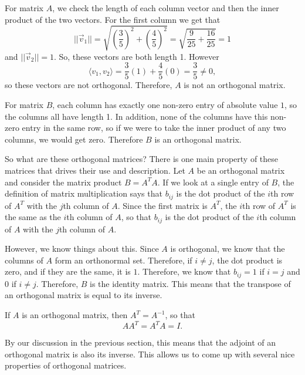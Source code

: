 \documentclass{ximera}
\begin{document}
\begin{exampleSol}
    For matrix $A$, we check the length of each column vector and then the inner product of the two vectors. For the first column we get that
    \[ 
        ||\vec{v}_1|| = \sqrt{\left(\frac{3}{5}\right)^2 + \left(\frac{4}{5}\right)^2} = \sqrt{\frac{9}{25} + \frac{16}{25}} = 1 
    \] 
    and $||\vec{v}_2|| = 1$. So, these vectors are both length 1. However
    \[
        \langle v_1, v_2 \rangle = \frac{3}{5}(1) + \frac{4}{5}(0) = \frac{3}{5} \neq 0, 
    \] 
    so these vectors are not orthogonal. Therefore, $A$ is not an orthogonal matrix.
    
    For matrix $B$, each column has exactly one non-zero entry of absolute value $1$, so the columns all have length 1. In addition, none of the columns have this non-zero entry in the same row, so if we were to take the inner product of any two columns, we would get zero. Therefore $B$ is an orthogonal matrix. 
\end{exampleSol}

So what are these orthogonal matrices? There is one main property of these matrices that drives their use and description. Let $A$ be an orthogonal matrix and consider the matrix product $B = A^TA$. If we look at a single entry of $B$, the definition of matrix multiplication says that $b_{ij}$ is the dot product of the $i$th row of $A^T$ with the $j$th column of $A$. Since the first matrix is $A^T$, the $i$th row of $A^T$ is the same as the $i$th column of $A$, so that $b_{ij}$ is the dot product of the $i$th column of $A$ with the $j$th column of $A$. 

However, we know things about this. Since $A$ is orthogonal, we know that the columns of $A$ form an orthonormal set. Therefore, if $i \neq j$, the dot product is zero, and if they are the same, it is $1$. Therefore, we know that $b_{ij} = 1$ if $i=j$ and $0$ if $i \neq j$. Therefore, $B$ is the identity matrix. This means that the transpose of an orthogonal matrix is equal to its inverse.

\begin{theorem}{}
    If $A$ is an orthogonal matrix, then $A^T = A^{-1}$, so that 
    \[ 
        AA^T = A^TA = I. 
    \]
\end{theorem} 

By our discussion in the previous section, this means that the adjoint of an orthogonal matrix is also its inverse. This allows us to come up with several nice properties of orthogonal matrices.
\end{document}
